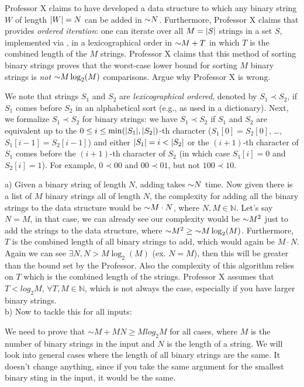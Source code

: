 \begin{problem}
\begin{questions}
\item Professor X claims to have developed a data structure  to which any binary string $W$ of length $\lvert W \rvert = N$ can be added in $\mathord{\sim}N$. Furthermore, Professor X claims that   provides \emph{ordered iteration}: one can iterate over all $M = \lvert S \rvert$ strings in a set $S$, implemented via , in a lexicographical order in $\mathord{\sim}M + T$ in which $T$ is the combined length of the $M$ strings. Professor X claims that this method of sorting binary strings proves that the worst-case lower bound for sorting $M$ binary strings is \emph{not} $\mathord{\sim}M \log_2(M)$ comparisons. Argue why Professor X is wrong.

We note that strings $S_1$ and $S_2$ are \emph{lexicographical ordered}, denoted by $S_1 \prec S_2$, if $S_1$ comes before $S_2$ in an alphabetical sort (e.g., as used in a dictionary). Next, we formalize $S_1 \prec S_2$ for binary strings: we have $S_1 \prec S_2$ if $S_1$ and $S_2$ are equivalent up to the $0\leq i \leq \min(\lvert S_1 \rvert, \lvert S_2 \rvert)$-th character ($S_1[0] = S_2[0]$,
\dots, $S_1[i-1] = S_2[i-1]$) and either $\lvert S_1 \rvert = i < \lvert S_2 \rvert$ or the $(i+1)$-th character of $S_1$ comes before the $(i+1)$-th character of $S_2$ (in which case $S_1[i] = 0$ and $S_2[i] = 1$). For example, $0 \prec 00$ and $00 \prec 01$, but not $100 \prec 10$. 

a) Given a binary string of length $N$, adding takes $\mathord{\sim}N$ time.
Now given there is a list of $M$ binary strings all of length $N$, the complexity for adding all the binary strings to the data structure would be $\mathord{\sim}M \cdot N$, where $N,M \in \mathbb{N}$. Let's say $N = M$, in that case, we can already see our complexity would be $\mathord{\sim}M^2$ just to add the strings to the data structure, where $\mathord{\sim}M^2 \geq \mathord{\sim}M \log_2(M)$.
Furthermore, $T$ is the combined length of all binary strings to add, which would again be $M \cdot N$. Again we can see $\exists N, N>M \log_2(M)$ (ex. $N = M$), then this will be greater than the bound set by the Professor.
Also the complexity of this algorithm relies on $T$ which is the combined length of the strings. Professor X assumes that $T < log_2{M}$, $\forall T,M \in \mathbb{N}$, which is not always the case, especially if you have larger binary strings. \\

b) Now to tackle this for all inputs:

We need to prove that $\sim M + MN \geq M log_2{M}$ for all cases, where $M$ is the number of binary strings in the input and $N$ is the length of a string. We will look into general cases where the length of all binary strings are the same. It doesn't change anything, since if you take the same argument for the smallest binary sting in the input, it would be the same.


\end{questions}
\end{problem}
